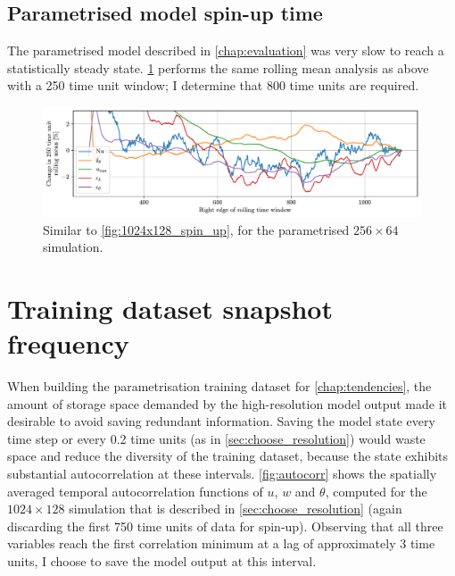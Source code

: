 \documentclass[../main.tex]{subfiles}
\begin{document}
\subsection{Parametrised model spin-up time} \label{sec:parametrised_spinup}
The parametrised model described in \cref{chap:evaluation} was very slow
to reach a statistically steady state. \cref{fig:parametrised_spin_up} performs
the same rolling mean analysis as above with a 250 time unit window;
I determine that 800 time units are required.

\begin{figure}[ht]
    \centering
    \includegraphics[width=\linewidth]{figures/parametrised_spin_up.pdf}
    \caption{
        Similar to \cref{fig:1024x128_spin_up}, for the parametrised
        $256 \times 64$ simulation.
    }
    \label{fig:parametrised_spin_up}
\end{figure}


\clearpage
\section{Training dataset snapshot frequency} \label{sec:snapshot_freq}
When building the parametrisation training dataset for
\cref{chap:tendencies}, the amount of storage space demanded by the
high-resolution model output made it desirable to avoid saving redundant
information. Saving the model state every time step or every 0.2 time units
(as in \cref{sec:choose_resolution}) would waste space and reduce the
diversity of the training dataset, because the state exhibits substantial
autocorrelation at these intervals. \cref{fig:autocorr} shows the
spatially averaged temporal autocorrelation functions of $u$, $w$ and $\theta$,
computed for the $1024 \times 128$ simulation that is described in
\cref{sec:choose_resolution} (again discarding the first 750 time units of
data for spin-up). Observing that all three variables reach the first
correlation minimum at a lag of approximately 3 time units, I choose to
save the model output at this interval.
\end{document}

